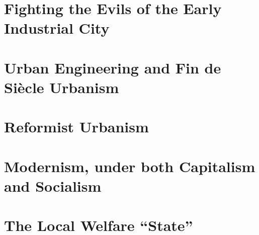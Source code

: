 \documentclass{article}
\begin{document}
\section{Fighting the Evils of the Early Industrial City}

\subsection{}

\section{Urban Engineering and Fin de Siècle Urbanism}

\subsection{}

\section{Reformist Urbanism}

\subsection{}

\section{Modernism, under both Capitalism and Socialism}

\subsection{}

\section{The Local Welfare ``State''}

\subsection{}
\end{document}
